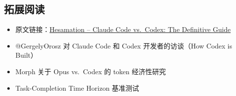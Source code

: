 \documentclass[a4paper]{article}
\begin{document}
\subsection{拓展阅读}

\begin{itemize}
    \item 原文链接：\href{https://x.com/Hesamation/status/2031418875946958915}{Hesamation -- Claude Code vs.\ Codex: The Definitive Guide}
    \item @GergelyOrosz 对 Claude Code 和 Codex 开发者的访谈（How Codex is Built）
    \item Morph 关于 Opus vs.\ Codex 的 token 经济性研究
    \item Task-Completion Time Horizon 基准测试
\end{itemize}

\end{document}
